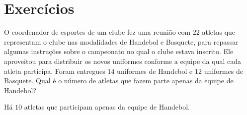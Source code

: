 \section{Exercícios}

\construirExer

\begin{exer}
O coordenador de esportes de um clube fez uma reunião com $22$ atletas que representam o clube nas modalidades de Handebol e Basquete, para repassar algumas instruções sobre o campeonato no qual o clube estava inscrito. Ele aproveitou para distribuir os novos uniformes conforme a equipe da qual cada atleta participa. Foram entregues $14$ uniformes de Handebol e $12$ uniformes de Basquete. Qual é o número de atletas que fazem parte apenas da equipe de Handebol?
\end{exer}
\begin{resp}
 Há $10$ atletas que participam apenas da equipe de Handebol.
\end{resp}